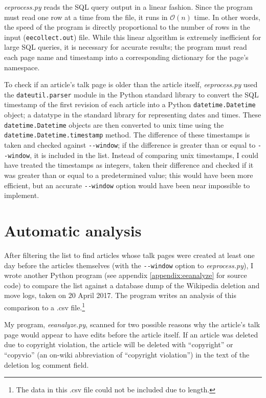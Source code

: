 \documentclass[14pt,a4paper]{report}
\begin{document}
\textit{eeprocess.py} reads the SQL query output in a linear fashion. Since the program must read one row at a time from the file, it runs in $\mathcal{O}(n)$ time. In other words, the speed of the program is directly proportional to the number of rows in the input (\lstinline[language=sh]{eecollect.out}) file. While this linear algorithm is extremely inefficient for large SQL queries, it is necessary for accurate results; the program must read each page name and timestamp into a corresponding dictionary for the page's namespace.

To check if an article's talk page is older than the article itself, \textit{eeprocess.py} used the \lstinline[language=python]{dateutil.parser} module in the Python standard library to convert the SQL timestamp of the first revision of each article into a Python \lstinline[language=python]{datetime.Datetime} object; a datatype in the standard library for representing dates and times. These \lstinline[language=python]{datetime.Datetime} objects are then converted to unix time using the \lstinline[language=python]{datetime.Datetime.timestamp} method. The difference of these timestamps is taken and checked against \lstinline[language=sh]{--window}; if the difference is greater than or equal to \lstinline[language=sh]{--window}, it is included in the list. Instead of comparing unix timestamps, I could have treated the timestamps as integers, taken their difference and checked if it was greater than or equal to a predetermined value; this would have been more efficient, but an accurate \lstinline[language=sh]{--window} option would have been near impossible to implement.

\chapter{Automatic analysis}
After filtering the list to find articles whose talk pages were created at least one day before the articles themselves (with the \lstinline[language=sh]{--window} option to \textit{eeprocess.py}), I wrote another Python program (see appendix \ref{appendix:eeanalyze} for source code) to compare the list against a database dump of the Wikipedia deletion and move logs, taken on 20 April 2017. The program writes an analysis of this comparison to a .csv file.\footnote{The data in this .csv file could not be included due to length.}

My program, \textit{eeanalyze.py}, scanned for two possible reasons why the article's talk page would appear to have edits before the article itself. If an article was deleted due to copyright violation, the article will be deleted with ``copyright'' or ``copyvio'' (an on-wiki abbreviation of ``copyright violation'') in the text of the deletion log comment field.
\end{document}
